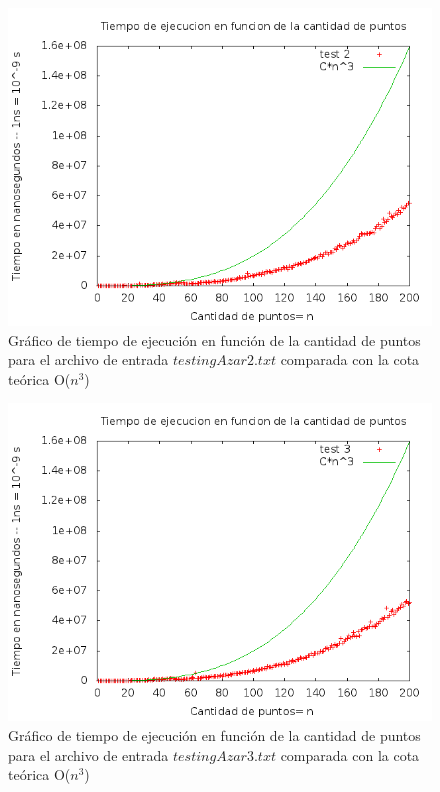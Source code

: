\begin{figure}[H]
	\centering
	\includegraphics[scale=0.5]{ej3-test2.png}
	\caption{ Gr\'afico de tiempo de ejecuci\'on en funci\'on de la cantidad de puntos para el archivo de entrada $testingAzar2.txt$ comparada con la cota te\'orica O($n^3$)}
\end{figure}

\begin{figure}[H]
	\centering
	\includegraphics[scale=0.5]{ej3-test3.png}
	\caption{ Gr\'afico de tiempo de ejecuci\'on en funci\'on de la cantidad de puntos para el archivo de entrada $testingAzar3.txt$ comparada con la cota te\'orica O($n^3$)}
\end{figure}

